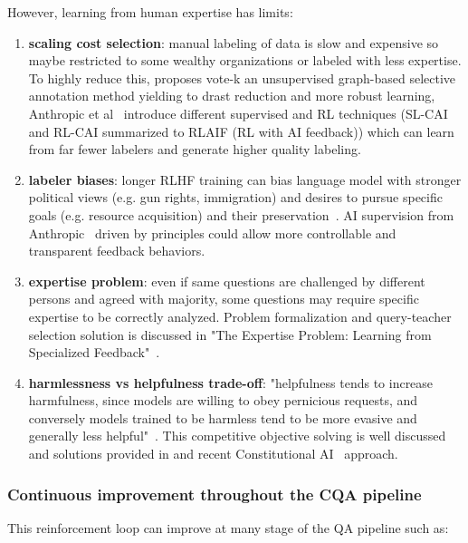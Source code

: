 \documentclass[acmsmall]{acmart}
\begin{document}
However, learning from human expertise has limits:
\begin{enumerate}
    \item \textbf{scaling cost selection}: manual labeling of data is slow and expensive so maybe restricted to some wealthy organizations or labeled with less expertise. To highly reduce this, \citet{suSelectiveAnnotationMakes2022} proposes vote-k an unsupervised graph-based selective annotation method yielding to drast reduction and more robust learning, Anthropic et al~\citep{baiConstitutionalAIHarmlessness2022} introduce different supervised and RL techniques (SL-CAI and RL-CAI summarized to RLAIF (RL with AI feedback)) which can learn from far fewer labelers and generate higher quality labeling.
    \item \textbf{labeler biases}: longer RLHF training can bias language model with stronger political views (e.g. gun rights, immigration) and desires to pursue specific goals (e.g. resource acquisition) and their preservation~\citep{perezDiscoveringLanguageModel2022}. AI supervision from Anthropic~\citep{baiConstitutionalAIHarmlessness2022} driven by principles could allow more controllable and transparent feedback behaviors.
    \item \textbf{expertise problem}: even if same questions are challenged by different persons and agreed with majority, some questions may require specific expertise to be correctly analyzed. Problem formalization and query-teacher selection solution is discussed in "The Expertise Problem: Learning from Specialized Feedback"~\citep{daniels-kochExpertiseProblemLearning2022}.
    \item \textbf{harmlessness vs helpfulness trade-off}: "helpfulness tends to increase harmfulness, since models are willing to obey pernicious requests, and conversely  models  trained  to  be  harmless  tend  to  be  more  evasive  and  generally  less  helpful"~\citep{baiConstitutionalAIHarmlessness2022}. This competitive objective solving is well discussed and solutions provided in \citet{baiTrainingHelpfulHarmless2022} and recent Constitutional AI~\citep{baiConstitutionalAIHarmlessness2022} approach.
\end{enumerate}

\subsubsection{Continuous improvement throughout the CQA pipeline}
This reinforcement loop can improve at many stage of the QA pipeline such as:
\end{document}
